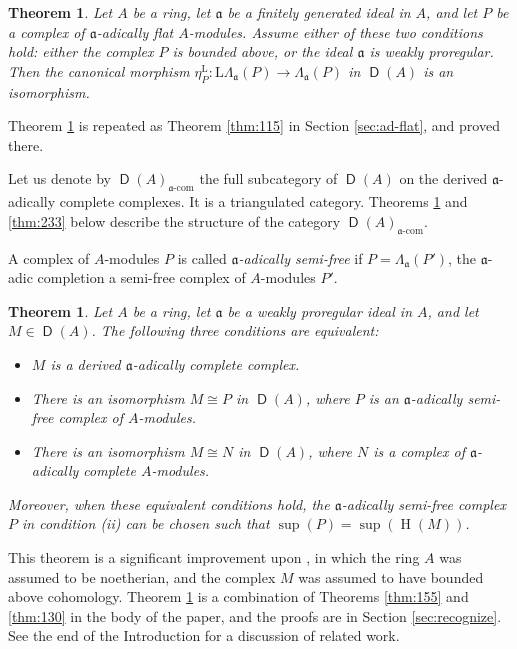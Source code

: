 \documentclass[10pt]{amsart}
\newtheorem{thm}[equation]{Theorem}
\theoremstyle{definition}
\numberwithin{equation}{section}
\newcommand{\opn}{\operatorname}
\newcommand{\cat}[1]{\operatorname{\mathsf{#1}}}
\newcommand{\rmitem}[1]{\item[\textrm{(#1)}]}
\newcommand{\mfrak}[1]{\mathfrak{#1}}
\newcommand{\mrm}[1]{\mathrm{#1}}
\newcommand{\La}{\Lambda}
\renewcommand{\a}{\mfrak{a}}
\newcommand{\tup}[1]{\textrm{#1}}
\begin{document}
\begin{thm} \label{thm:436}
Let $A$ be a ring, let $\a$ be a finitely generated ideal in $A$,
and let $P$ be a complex of $\a$-adically flat $A$-modules.
Assume either of these two conditions hold: either the complex $P$ is bounded
above, or the ideal $\a$ is weakly proregular.
Then the canonical morphism
$\eta^{\mrm{L}}_{P} : \mrm{L} \La_{\a}(P) \to \La_{\a}(P)$
in $\cat{D}(A)$ is an isomorphism.
\end{thm}

Theorem \ref{thm:436} is repeated as Theorem
\ref{thm:115} in Section \ref{sec:ad-flat}, and proved there.

Let us denote by $\cat{D}(A)_{\tup{$\a$-com}}$ the full subcategory of
$\cat{D}(A)$ on the derived $\a$-adically complete complexes.
It is a triangulated category. Theorems \ref{thm:232} and \ref{thm:233}
below describe the structure of the category $\cat{D}(A)_{\tup{$\a$-com}}$.

A complex of $A$-modules $P$ is called {\em $\a$-adically semi-free} if
$P = \La_{\a}(P')$, the $\a$-adic completion a semi-free
complex of $A$-modules $P'$.

\begin{thm} \label{thm:232}
Let $A$ be a ring, let $\a$ be a weakly proregular ideal in $A$, and
let $M \in \cat{D}(A)$. The following three conditions are equivalent:
\begin{itemize}
\rmitem{i} $M$ is a derived $\a$-adically complete complex.

\rmitem{ii} There is an isomorphism $M \cong P$
in $\cat{D}(A)$, where $P$ is an $\a$-adically semi-free complex of
$A$-modules.

\rmitem{iii} There is an isomorphism $M \cong N$ in $\cat{D}(A)$,
where $N$ is a complex of $\a$-adically complete $A$-modules.
\end{itemize}
Moreover, when these equivalent conditions hold, the $\a$-adically semi-free
complex $P$ in condition \tup{(ii)} can be chosen such that
$\opn{sup}(P) = \opn{sup}(\opn{H}(M))$.
\end{thm}

This theorem is a significant improvement upon \cite[Theorem 1.15]{PSY2},
in which the ring $A$ was assumed to be noetherian, and the complex $M$ was
assumed to have bounded above cohomology.
Theorem \ref{thm:232} is a combination of Theorems \ref{thm:155} and
\ref{thm:130} in the body of the paper, and the proofs are in Section
\ref{sec:recognize}.
See the end of the Introduction for a discussion of related work.
\end{document}
